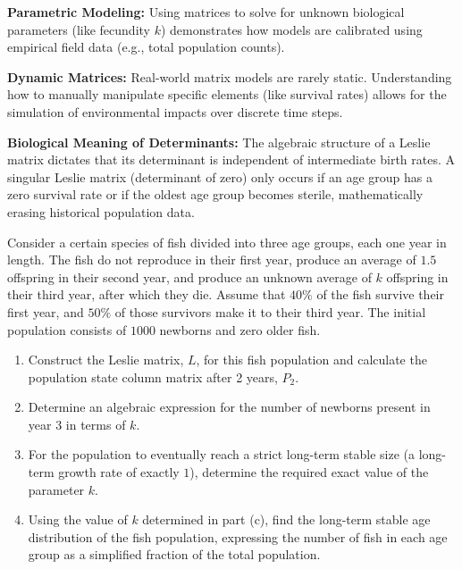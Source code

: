 \begin{takeaways}
\item \textbf{Parametric Modeling:} Using matrices to solve for unknown biological parameters (like fecundity $k$) demonstrates how models are calibrated using empirical field data (e.g., total population counts).
\item \textbf{Dynamic Matrices:} Real-world matrix models are rarely static. Understanding how to manually manipulate specific elements (like survival rates) allows for the simulation of environmental impacts over discrete time steps.
\item \textbf{Biological Meaning of Determinants:} The algebraic structure of a Leslie matrix dictates that its determinant is independent of intermediate birth rates. A singular Leslie matrix (determinant of zero) only occurs if an age group has a zero survival rate or if the oldest age group becomes sterile, mathematically erasing historical population data.
\end{takeaways}


\begin{problem}
Consider a certain species of fish divided into three age groups, each one year in length. The fish do not reproduce in their first year, produce an average of $1.5$ offspring in their second year, and produce an unknown average of $k$ offspring in their third year, after which they die. Assume that $40\%$ of the fish survive their first year, and $50\%$ of those survivors make it to their third year. The initial population consists of $1000$ newborns and zero older fish.

\begin{enumerate}[label=\textbf{(\alph*)}]
    \item Construct the Leslie matrix, $L$, for this fish population and calculate the population state column matrix after 2 years, $P_2$.
    \item Determine an algebraic expression for the number of newborns present in year 3 in terms of $k$.
    \item For the population to eventually reach a strict long-term stable size (a long-term growth rate of exactly $1$), determine the required exact value of the parameter $k$.
    \item Using the value of $k$ determined in part (c), find the long-term stable age distribution of the fish population, expressing the number of fish in each age group as a simplified fraction of the total population.
\end{enumerate}
\end{problem}

